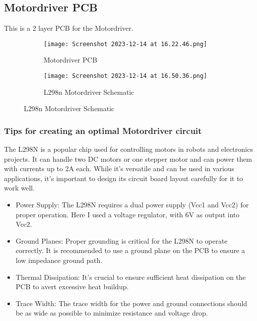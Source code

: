\documentclass[../report.tex]{subfiles}
\begin{document}
\subsection{Motordriver PCB}
This is a 2 layer PCB for the Motordriver. 
\begin{figure}[H]
    \centering
    \begin{subfigure}[b]{0.4\linewidth}
      \texttt{[image: Screenshot 2023-12-14 at 16.22.46.png]}
      \caption{Motordriver PCB} 
    \end{subfigure}
    \begin{subfigure}[b]{0.4\linewidth}
      \texttt{[image: Screenshot 2023-12-14 at 16.50.36.png]}
      \caption{L298n Motordriver Schematic}
    \end{subfigure}
  \end{figure}

  \subsubsection{Tips for creating an optimal Motordriver circuit}
  The L298N is a popular chip used for controlling motors in robots and electronics projects. It can handle two DC motors or one stepper motor and can power them with currents up to 2A each. While it's versatile and can be used in various applications, it's important to design its circuit board layout carefully for it to work well. 
  \begin{itemize}
    \item Power Supply: The L298N requires a dual power supply (Vcc1 and Vcc2) for proper operation. Here I used a voltage regulator, with 6V as output into Vcc2. 
    \item Ground Planes: Proper grounding is critical for the L298N to operate correctly. It is recommended to use a ground plane on the PCB to ensure a low impedance ground path.
    \item Thermal Dissipation: It's crucial to ensure sufficient heat dissipation on the PCB to avert excessive heat buildup. 
    \item Trace Width: The trace width for the power and ground connections should be as wide as possible to minimize resistance and voltage drop.
\end{itemize} 
\end{document}
